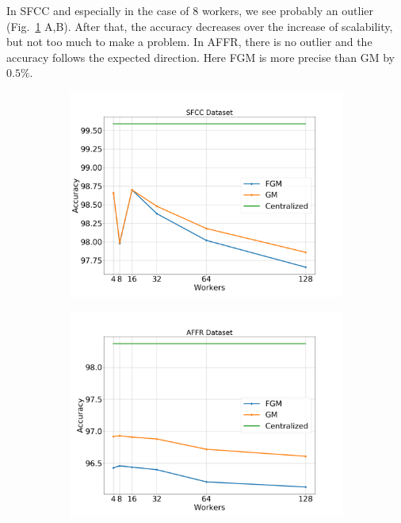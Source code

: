 In SFCC and especially in the case of $8$ workers, we see probably an outlier (Fig.~\ref{fig:sfcc-affr_3_1} A,B).
After that, the accuracy decreases over the increase of scalability, but not too much to make a problem.
In AFFR, there is no outlier and the accuracy follows the expected direction.
Here FGM is more precise than GM by $0.5\%$.

\begin{figure}[H]
    \centering
    \begin{subfigure}[b]{0.45\textwidth}
        \centering
        \includegraphics[width=\textwidth]{./images/results/sfc-plots/exp_Fig_3_1.png}
        \caption{}
    \end{subfigure}
    \hfill
    \begin{subfigure}[b]{0.45\textwidth}
        \centering
        \includegraphics[width=\textwidth]{./images/results/amazon-plots/exp_Fig_3_1.png}
        \caption{}
    \end{subfigure}
    \caption{}\label{fig:sfcc-affr_3_1}
\end{figure}

